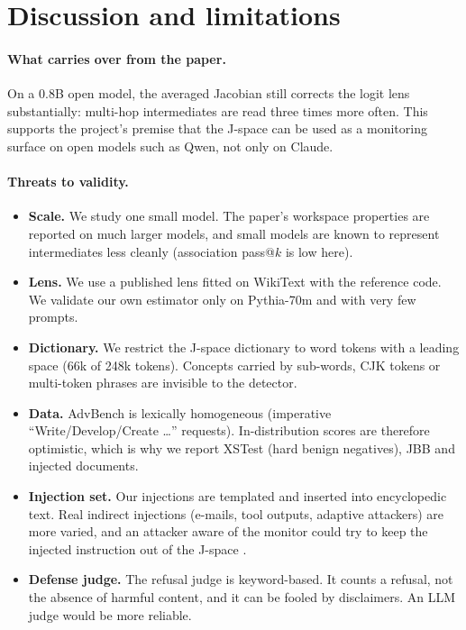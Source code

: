 \section{Discussion and limitations}

\paragraph{What carries over from the paper.} On a 0.8B open model, the averaged Jacobian
still corrects the logit lens substantially: multi-hop intermediates are read three times
more often. This supports the project's premise that the J-space can be used as a
monitoring surface on open models such as Qwen, not only on Claude.

\paragraph{Threats to validity.}
\begin{itemize}
  \item \textbf{Scale.} We study one small model. The paper's workspace properties are
        reported on much larger models, and small models are known to represent
        intermediates less cleanly (association pass@$k$ is low here).
  \item \textbf{Lens.} We use a published lens fitted on WikiText with the reference code. We
        validate our own estimator only on Pythia-70m and with very few prompts.
  \item \textbf{Dictionary.} We restrict the J-space dictionary to word tokens with a leading
        space (66k of 248k tokens). Concepts carried by sub-words, CJK tokens or multi-token
        phrases are invisible to the detector.
  \item \textbf{Data.} AdvBench is lexically homogeneous (imperative ``Write/Develop/Create
        \dots'' requests). In-distribution scores are therefore optimistic, which is why we
        report XSTest (hard benign negatives), JBB and injected documents.
  \item \textbf{Injection set.} Our injections are templated and inserted into encyclopedic
        text. Real indirect injections (e-mails, tool outputs, adaptive attackers) are more
        varied, and an attacker aware of the monitor could try to keep the injected
        instruction out of the J-space \citep{winninger2025mechanistic}.
  \item \textbf{Defense judge.} The refusal judge is keyword-based. It counts a refusal, not
        the absence of harmful content, and it can be fooled by disclaimers. An LLM judge
        would be more reliable.
\end{itemize}

